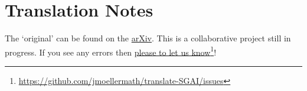 \documentclass[../main.tex]{subfiles}
\begin{document}
\chapter*{Translation Notes}

The `original' can be found on the \href{https://arxiv.org/abs/math/0206203}{arXiv}.
This is a collaborative project still in progress. If you see any errors then \href{https://github.com/jmoellermath/translate-SGAI/issues}{please to let us know}\footnote{\url{https://github.com/jmoellermath/translate-SGAI/issues}}!

\end{document}
